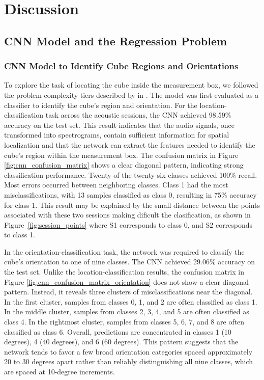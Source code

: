 
\chapter{Discussion}
\label{chapter:discussion}

\newpage

\section{CNN Model and the Regression Problem}

\subsection{CNN Model to Identify Cube Regions and Orientations}

To explore the task of locating the cube inside the measurement box, we followed the problem-complexity tiers described by \citeauthor{vapnikstatistical} in \cite{vapnikstatistical}. The model was first evaluated as a classifier to identify the cube's region and orientation. For the location-classification task across the acoustic sessions, the CNN achieved 98.59\% accuracy on the test set. This result indicates that the audio signals, once transformed into spectrograms, contain sufficient information for spatial localization and that the network can extract the features needed to identify the cube's region within the measurement box. The confusion matrix in Figure \ref{fig:cnn_confusion_matrix} shows a clear diagonal pattern, indicating strong classification performance. Twenty of the twenty-six classes achieved 100\% recall. Most errors occurred between neighboring classes. Class 1 had the most misclassifications, with 13 samples classified as class 0, resulting in 75\% accuracy for class 1. This result may be explained by the small distance between the points associated with these two sessions making dificult the clasification, as shown in Figure~\ref{fig:session_points} where S1 corresponds to class 0, and S2 corresponds to class 1.

In the orientation-classification task, the network was required to classify the cube's orientation to one of nine classes. The CNN achieved 29.06\% accuracy on the test set. Unlike the location-classification results, the confusion matrix in Figure \ref{fig:cnn_confusion_matrix_orientation} does not show a clear diagonal pattern. Instead, it reveals three clusters of misclassifications near the diagonal. In the first cluster, samples from classes 0, 1, and 2 are often classified as class 1. In the middle cluster, samples from classes 2, 3, 4, and 5 are often classified as class 4. In the rightmost cluster, samples from classes 5, 6, 7, and 8 are often classified as class 6. Overall, predictions are concentrated in classes 1 (10 degrees), 4 (40 degrees), and 6 (60 degrees). This pattern suggests that the network tends to favor a few broad orientation categories spaced approximately 20 to 30 degrees apart rather than reliably distinguishing all nine classes, which are spaced at 10-degree increments.

